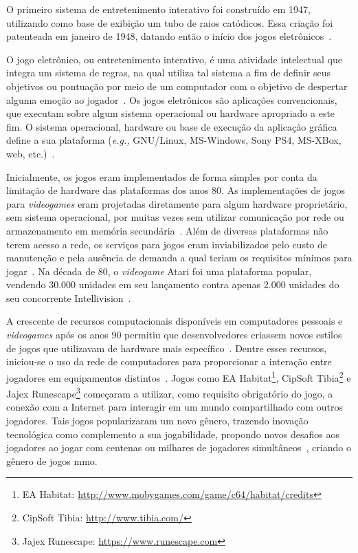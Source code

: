 O primeiro sistema de entretenimento interativo foi construído em 1947, utilizando como base de exibição um tubo de raios catódicos.
%
Essa criação foi patenteada em janeiro de 1948, datando então o início dos jogos eletrônicos~\cite{Adams2014Jan, patents1947Jan}.



O jogo eletrônico, ou entretenimento interativo, é uma atividade intelectual que integra um sistema de regras, na qual utiliza tal sistema a fim de definir seus objetivos ou pontuação por meio de um computador com o objetivo de despertar alguma emoção ao jogador~\cite{video_game_technologies}.
%
Os jogos eletrônicos são aplicações convencionais, que executam sobre algum sistema operacional ou hardware apropriado a este fim.
%
O sistema operacional, hardware ou base de execução da aplicação gráfica define a sua plataforma (\textit{e.g.,} GNU/Linux, MS-Windows, Sony PS4, MS-XBox, web, etc.)~\cite{adams_1208533}.



Inicialmente, os jogos eram implementados de forma simples por conta da limitação de hardware das plataformas dos anos 80.
%
As implementações de jogos para \textit{videogames} eram projetadas diretamente para algum hardware proprietário, sem sistema operacional, por muitas vezes sem utilizar comunicação por rede ou armazenamento em memória secundária~\cite{rollings2003andrew}.
%
Além de diversas plataformas não terem acesso a rede, os serviços para jogos eram inviabilizados pelo custo de manutenção e pela ausência de demanda a qual teriam os requisitos mínimos para jogar~\cite{adams_1208533}.
%
Na década de 80, o \textit{videogame} Atari foi uma plataforma popular, vendendo 30.000 unidades em seu lançamento contra apenas 2.000 unidades do seu concorrente Intellivision~\cite{atari_age}.



A crescente de recursos computacionais disponíveis em computadores pessoais e \textit{videogames} após os anos 90 permitiu que desenvolvedores criassem novos estilos de jogos que utilizavam de hardware mais específico~\cite{adams_1208533}.
%
Dentre esses recursos, iniciou-se o uso da rede de computadores para proporcionar a interação entre jogadores em equipamentos distintos~\cite{statisita_consumo_rede}.
%
Jogos como EA Habitat\footnote{EA Habitat: \url{http://www.mobygames.com/game/c64/habitat/credits}}, CipSoft Tibia\footnote{CipSoft Tibia: \url{http://www.tibia.com/}} e Jajex Runescape\footnote{Jajex Runescape: \url{https://www.runescape.com}} começaram a utilizar, como requisito obrigatório do jogo, a conexão com a Internet para interagir em um mundo compartilhado com outros jogadores.
%
Tais jogos popularizaram um novo gênero, trazendo inovação tecnológica como complemento a sua jogabilidade, propondo novos desafios aos jogadores ao jogar com centenas ou milhares de jogadores simultâneos~\cite{guinness_runescape, 1417630}, criando o gênero de jogos \ac{mmo}.

